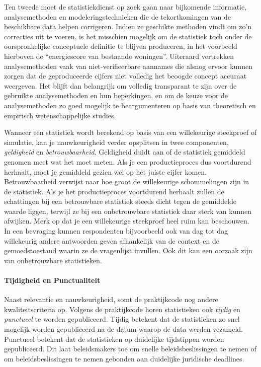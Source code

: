 \documentclass[\mainfiledir/00_handleiding_statistiekproductie.tex]{subfiles}
\begin{document}
Ten tweede moet de statistiekdienst op zoek gaan naar bijkomende informatie, analysemethoden en modeleringstechnieken die de tekortkomingen van de beschikbare data helpen corrigeren. Indien ze geschikte methoden vindt om zo'n correcties uit te voeren, is het misschien mogelijk om de statistiek toch onder de oorspronkelijke conceptuele definitie te blijven produceren, in het voorbeeld hierboven de ``energiescore van bestaande woningen''. Uiteraard vertrekken analysemethoden vaak van niet-verifieerbare aannames die alsnog ervoor kunnen zorgen dat de geproduceerde cijfers niet volledig het beoogde concept accuraat weergeven. Het blijft dan belangrijk om volledig transparant te zijn over de gebruikte analysemethoden en hun beperkingen, en om de keuze voor de analysemethoden zo goed mogelijk te beargumenteren op basis van theoretisch en empirisch wetenschappelijke studies.

\begin{info}
	Wanneer een statistiek wordt berekend op basis van een willekeurige steekproef of simulatie, kan je nauwkeurigheid verder opsplitsen in twee componenten, \emph{geldigheid} en \emph{betrouwbaarheid}. Geldigheid duidt aan of de statistiek gemiddeld genomen meet wat het moet meten. Als je een productieproces dus voortdurend herhaalt, moet je gemiddeld gezien wel op het juiste cijfer komen. Betrouwbaarheid verwijst naar hoe groot de willekeurige schommelingen zijn in de statistiek. Als je het productieproces voortdurend herhaalt zullen de schattingen bij een betrouwbare statistiek steeds dicht tegen de gemiddelde waarde liggen, terwijl ze bij een onbetrouwbare statistiek daar sterk van kunnen afwijken. Merk op dat je een willekeurige steekproef heel ruim kan beschouwen. In een bevraging kunnen respondenten bijvoorbeeld ook van dag tot dag willekeurig andere antwoorden geven afhankelijk van de context en de gemoedstoestand waarin ze de vragenlijst invullen. Ook dit kan een oorzaak zijn van onbetrouwbare statistieken.
\end{info}

  
\paragraph{Tijdigheid en Punctualiteit}

Naast relevantie en nauwkeurigheid, somt de praktijkcode nog andere kwaliteitscriteria op. Volgens de praktijkcode horen statistieken ook \emph{tijdig} en \emph{punctueel} te worden gepubliceerd. Tijdig betekent dat de statistieken zo snel mogelijk worden gepubliceerd na de datum waarop de data werden vezameld. Punctueel betekent dat de statistieken op duidelijke tijdstippen worden gepubliceerd. Dit laat beleidsmakers toe om snelle beleidsbeslissingen te nemen of om beleidsbeslissingen te nemen gebonden aan duidelijke juridische deadlines.
\end{document}
